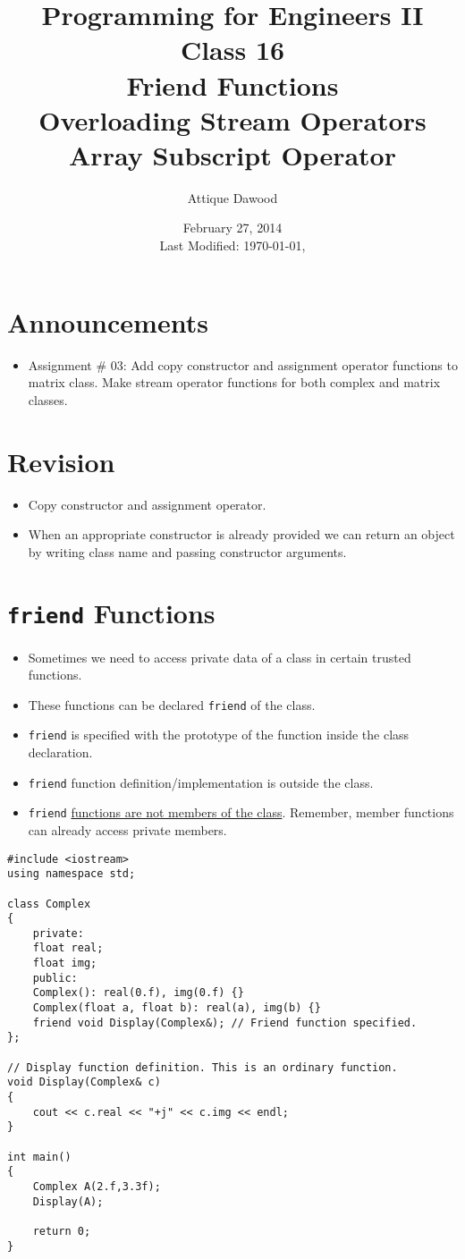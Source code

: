 \documentclass[12pt,a4paper]{article}
\title{\vspace{-2cm}Programming for Engineers II\\Class 16\\Friend Functions\\Overloading Stream Operators\\Array Subscript Operator}
\author{Attique Dawood}
\date{February 27, 2014\\[0.2cm] Last Modified: \today, \currenttime}
\begin{document}
\maketitle
\section{Announcements}
\begin{itemize}
\item Assignment \# 03: Add copy constructor and assignment operator functions to matrix class. Make stream operator functions for both complex and matrix classes.
\end{itemize}
\section{Revision}
\begin{itemize}
\item Copy constructor and assignment operator.
\item When an appropriate constructor is already provided we can return an object by writing class name and passing constructor arguments.
\end{itemize}
\section{\texttt{friend} Functions}
\begin{itemize}
\item Sometimes we need to access private data of a class in certain trusted functions.
\item These functions can be declared \verb|friend| of the class.
\item \verb|friend| is specified with the prototype of the function inside the class declaration.
\item \verb|friend| function definition/implementation is outside the class.
\item \verb|friend| \underline{functions are not members of the class}. Remember, member functions can already access private members.
\end{itemize}
\begin{lstlisting}[caption={\texttt{friend} function to display Complex number}]
#include <iostream>
using namespace std;

class Complex
{
	private:
	float real;
	float img;
	public:
	Complex(): real(0.f), img(0.f) {}
	Complex(float a, float b): real(a), img(b) {}
	friend void Display(Complex&); // Friend function specified.
};

// Display function definition. This is an ordinary function.
void Display(Complex& c)
{
	cout << c.real << "+j" << c.img << endl;
}

int main()
{
	Complex A(2.f,3.3f);
	Display(A);

	return 0;
}
\end{lstlisting}
\end{document}

